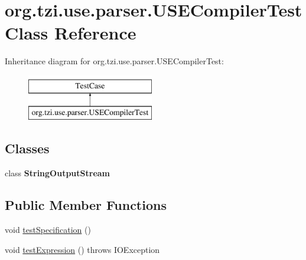 \hypertarget{classorg_1_1tzi_1_1use_1_1parser_1_1_u_s_e_compiler_test}{\section{org.\-tzi.\-use.\-parser.\-U\-S\-E\-Compiler\-Test Class Reference}
\label{classorg_1_1tzi_1_1use_1_1parser_1_1_u_s_e_compiler_test}
}
Inheritance diagram for org.\-tzi.\-use.\-parser.\-U\-S\-E\-Compiler\-Test\-:\begin{figure}[H]
\begin{center}
\leavevmode
\includegraphics[height=2.000000cm]{classorg_1_1tzi_1_1use_1_1parser_1_1_u_s_e_compiler_test}
\end{center}
\end{figure}
\subsection*{Classes}
\begin{DoxyCompactItemize}
\item 
class {\bfseries String\-Output\-Stream}
\end{DoxyCompactItemize}
\subsection*{Public Member Functions}
\begin{DoxyCompactItemize}
\item 
void \hyperlink{classorg_1_1tzi_1_1use_1_1parser_1_1_u_s_e_compiler_test_a1d7a4ba698f41cda1b6271e2b60baedf}{test\-Specification} ()
\item 
void \hyperlink{classorg_1_1tzi_1_1use_1_1parser_1_1_u_s_e_compiler_test_ab36218589aaebfe7ff771426743d6841}{test\-Expression} ()  throws I\-O\-Exception 
\end{DoxyCompactItemize}


